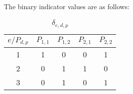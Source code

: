 The binary indicator values are as follows:

\begin{table}[H]
	\centering
	\caption{$\delta_{e,d,p}$}
	\label{tab:label}
	\begin{tabular}{||c|c|c|c|c||}
	\hline
	\rowcolor{gray!50}
	$e/P_{d,p}$ & $P_{1,1}$ & $P_{1,2}$ &  $P_{2,1}$ & $P_{2,2}$ \\
	\hline
	1 & 1 & 0 & 0 & 1\\
	2 & 0 & 1 & 1 & 0\\
	3 & 0 & 1 & 0 & 1\\
	\hline \hline
	\end{tabular}
\end{table}
